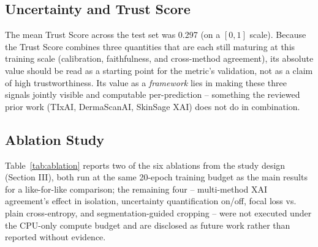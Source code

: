 \documentclass[conference]{IEEEtran}
\begin{document}
\subsection{Uncertainty and Trust Score}

The mean Trust Score across the test set was 0.297 (on a $[0,1]$ scale). Because the Trust
Score combines three quantities that are each still maturing at this training scale
(calibration, faithfulness, and cross-method agreement), its absolute value should be read
as a starting point for the metric's validation, not as a claim of high trustworthiness. Its
value as a \emph{framework} lies in making these three signals jointly visible and
computable per-prediction -- something the reviewed prior work (TIxAI, DermaScanAI,
SkinSage XAI) does not do in combination.

\subsection{Ablation Study}
\label{sec:ablation}

Table~\ref{tab:ablation} reports two of the six ablations from the study design (Section
III), both run at the same 20-epoch training budget as the main results for a like-for-like
comparison; the remaining four -- multi-method XAI agreement's effect in isolation,
uncertainty quantification on/off, focal loss vs. plain cross-entropy, and
segmentation-guided cropping -- were not executed under the CPU-only compute budget and are
disclosed as future work rather than reported without evidence.

\begin{table}[t]
\centering
\caption{Ablation results}
\label{tab:ablation}
\end{table}
\end{document}
